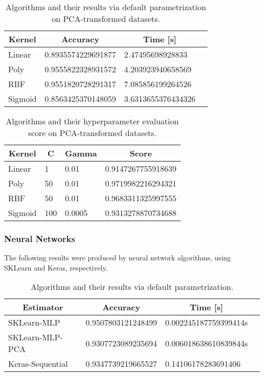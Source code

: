 \begin{table}[H]
    \centering
    \begin{tabular}{|l|l|l|l|}\hline
        \multicolumn{1}{|c|}{Kernel} & \multicolumn{1}{|c|}{Accuracy} & \multicolumn{1}{|c|}{Time [s]} \\\hline
        Linear  & 0.8935574229691877    & 2.47495698928833\\
        Poly    & 0.9555822328931572    & 4.203923940658569\\
        RBF     & 0.9551820728291317    & 7.085856199264526\\
        Sigmoid & 0.8563425370148059    & 3.6313655376434326\\\hline
    \end{tabular}
    \caption{Algorithms and their results via default parametrization on PCA-transformed datasets.}
    \label{tab:svm_pca_results_fit}
\end{table}
\begin{table}[H]
    \centering
    \begin{tabular}{|l|l|l|l|}\hline
        \multicolumn{1}{|c|}{Kernel} & \multicolumn{1}{|c|}{C} & \multicolumn{1}{|c|}{Gamma} & \multicolumn{1}{|c|}{Score} \\\hline
        Linear      & 1     & 0.01      & 0.9147267755918639 \\
        Poly        & 50    & 0.01      & 0.9719982216294321 \\
        RBF         & 50    & 0.01      & 0.9683311325997555 \\
        Sigmoid     & 100   & 0.0005    & 0.9313278870734688 \\\hline
    \end{tabular}
    \caption{Algorithms and their hyperparameter evaluation score on PCA-transformed datasets.}
    \label{tab:svm_pca_results_hyperparameter}
\end{table}

\subsubsection{Neural Networks}
The following results were produced by neural network algorithms, using SKLearn and Keras, respectively.
\begin{table}[H]
    \centering
    \begin{tabular}{|l|l|l|l|}\hline
        \multicolumn{1}{|c|}{Estimator} & \multicolumn{1}{|c|}{Accuracy} & \multicolumn{1}{|c|}{Time [s]} \\\hline
        SKLearn-MLP         & 0.9507803121248499 & 0.002245187759399414s \\
        SKLearn-MLP-PCA     & 0.9307723089235694 & 0.006018638610839844s \\
        Keras-Sequential    & 0.9347739219665527 & 0.14106178283691406  \\\hline
    \end{tabular}
    \caption{Algorithms and their results via default parametrization.}
    \label{tab:nn_results_fit_pca}
\end{table}

